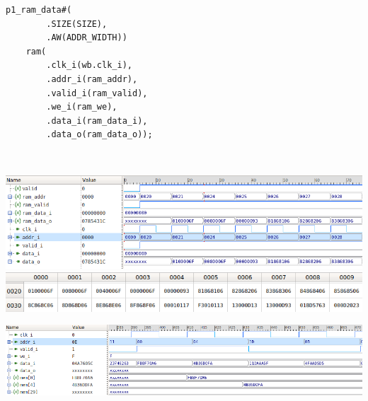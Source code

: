 \documentclass[11pt,a4paper]{article}
\begin{document}
\begin{minipage}{.49\textwidth}
\begin{scriptsize}
\begin{lstlisting}[label=Lis:ram_1p_data,caption=Instancja pamięci danych]
    p1_ram_data#(
        .SIZE(SIZE),
        .AW(ADDR_WIDTH))
    ram(
        .clk_i(wb.clk_i),
        .addr_i(ram_addr),
        .valid_i(ram_valid),
        .we_i(ram_we),
        .data_i(ram_data_i),
        .data_o(ram_data_o));
\end{lstlisting}
\end{scriptsize}
\end{minipage}\\
					\begin{minipage}[c]{\textwidth}

					\includegraphics[width=\textwidth]{./rysunki/ram_sim.png}
					\includegraphics[width=\textwidth]{./rysunki/pamiec_ram.png}

			\end{minipage} 
					\begin{minipage}[c]{\textwidth}
					\includegraphics[width=\textwidth]{./rysunki/zapis_ram.png}
			\end{minipage} 
			
\end{document}
